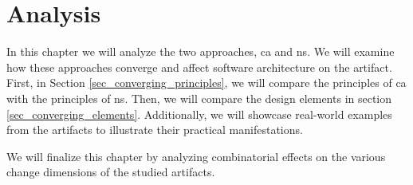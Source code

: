 \chapter{Analysis} \label{chap_evaluation}

In this chapter we will analyze the two approaches, \gls{ca} and \gls{ns}. We will examine
how these approaches converge and affect software architecture on the artifact. First, in
Section \ref{sec_converging_principles}, we will compare the principles of \gls{ca} with
the principles of \gls{ns}. Then, we will compare the design elements in section
\ref{sec_converging_elements}. Additionally, we will showcase real-world examples from the
artifacts to illustrate their practical manifestations.

We will finalize this chapter by analyzing combinatorial effects on the various change
dimensions of the studied artifacts.







